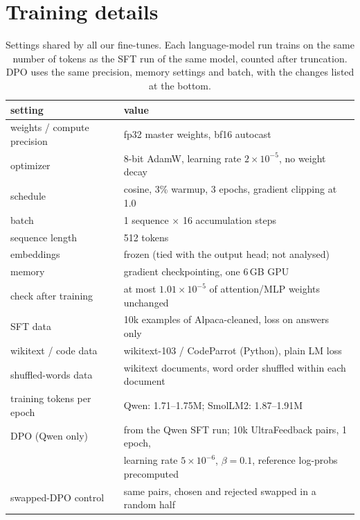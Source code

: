\section{Training details}
\label{app:training}

\begin{table}[H]
\caption{Settings shared by all our fine-tunes. Each language-model run trains
on the same number of tokens as the SFT run of the same model, counted after
truncation. DPO uses the same precision, memory settings and batch, with the
changes listed at the bottom.}
\label{tab:hparams}
\begin{center}
\small
\begin{tabular}{ll}
\toprule
setting & value \\
\midrule
weights / compute precision & fp32 master weights, bf16 autocast \\
optimizer                   & 8-bit AdamW, learning rate $2\times10^{-5}$, no weight decay \\
schedule                    & cosine, 3\% warmup, 3 epochs, gradient clipping at 1.0 \\
batch                       & 1 sequence $\times$ 16 accumulation steps \\
sequence length             & 512 tokens \\
embeddings                  & frozen (tied with the output head; not analysed) \\
memory                      & gradient checkpointing, one 6\,GB GPU \\
check after training        & at most $1.01\times10^{-5}$ of attention/MLP weights unchanged \\
\midrule
SFT data                    & 10k examples of Alpaca-cleaned, loss on answers only \\
wikitext / code data        & wikitext-103 / CodeParrot (Python), plain LM loss \\
shuffled-words data         & wikitext documents, word order shuffled within each document \\
training tokens per epoch   & Qwen: 1.71--1.75M; SmolLM2: 1.87--1.91M \\
\midrule
DPO (Qwen only)             & from the Qwen SFT run; 10k UltraFeedback pairs, 1 epoch, \\
                            & learning rate $5\times10^{-6}$, $\beta=0.1$, reference log-probs precomputed \\
swapped-DPO control         & same pairs, chosen and rejected swapped in a random half \\
\bottomrule
\end{tabular}
\end{center}
\end{table}

